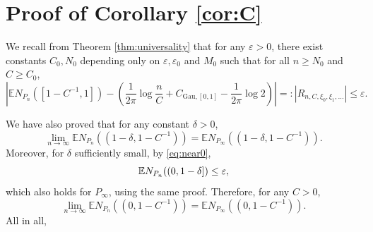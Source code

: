 \documentclass[12pt, reqno]{amsart}
\theoremstyle{plain}
\theoremstyle{definition}
\newcommand\E{{\mathbb{E}}}
\newcommand{\ep}{\varepsilon}
\begin{document}
 
 \section{Proof of Corollary \ref{cor:C}} \label{sec:cor}
 We recall from Theorem \ref{thm:universality} that for any $\ep>0$, there exist constants $C_0, N_0$ depending only on $\ep, \ep_0$ and $M_0$ such that for all $n\ge N_0$ and $C\ge C_0$,
 \begin{equation}
 		\left |	 \E N_{P_n}([1-C^{-1}, 1]) - \left (\frac{1}{2\pi}\log\frac{n}{C}+ C_{\mathrm{Gau}, [0, 1]}- \frac{1}{2\pi}\log 2\right ) \right |=:|R_{n, C, \xi_0, \xi_1,\dots}|\le \ep. \label{eq:diff:ep}
 	\end{equation}
  	
 	We have also proved that for any constant $\delta>0$,
 	\begin{equation}
 	\lim_{n\to\infty}	\E N_{P_n}((1-\delta, 1-C^{-1})) = \E N_{P_\infty}((1-\delta, 1-C^{-1})).
 	\end{equation}
 	Moreover, for $\delta$ sufficiently small, by \eqref{eq:near0},
 	\begin{equation}
 		\E N_{P_n}((0, 1-\delta])   \le \ep,\notag
 	\end{equation}
which also holds for $P_{\infty}$, using the same proof.
 	Therefore, for any $C>0$,
 	$$\lim_{n\to\infty}\E N_{P_n}((0, 1-C^{-1})) = \E N_{P_\infty}((0, 1-C^{-1})).$$
 	All in all, 
%
\end{document}
